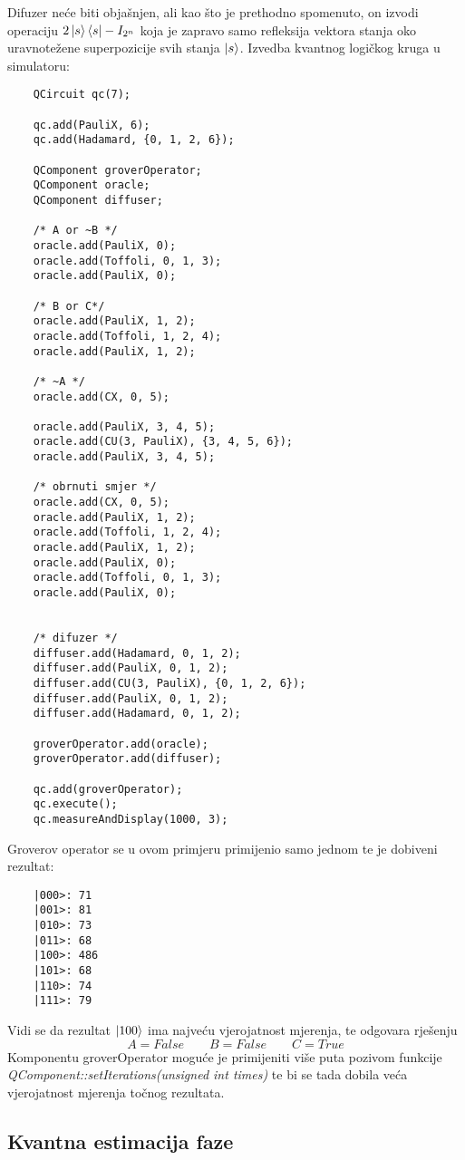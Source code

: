 Difuzer neće biti objašnjen, ali kao što je prethodno spomenuto, on izvodi operaciju $2\ket{s}\bra{s} - I_{2^n}$ koja je zapravo samo refleksija vektora stanja oko uravnotežene superpozicije svih stanja $\ket{s}$.
Izvedba kvantnog logičkog kruga u simulatoru:
\begin{lstlisting}
	QCircuit qc(7);

	qc.add(PauliX, 6);
	qc.add(Hadamard, {0, 1, 2, 6});

	QComponent groverOperator;
	QComponent oracle;
	QComponent diffuser;

	/* A or ~B */
	oracle.add(PauliX, 0);
	oracle.add(Toffoli, 0, 1, 3);
	oracle.add(PauliX, 0);
	
	/* B or C*/
	oracle.add(PauliX, 1, 2);
	oracle.add(Toffoli, 1, 2, 4);
	oracle.add(PauliX, 1, 2);

	/* ~A */
	oracle.add(CX, 0, 5);

	oracle.add(PauliX, 3, 4, 5);
	oracle.add(CU(3, PauliX), {3, 4, 5, 6});
	oracle.add(PauliX, 3, 4, 5);

	/* obrnuti smjer */
	oracle.add(CX, 0, 5);
	oracle.add(PauliX, 1, 2);
	oracle.add(Toffoli, 1, 2, 4);
	oracle.add(PauliX, 1, 2);
	oracle.add(PauliX, 0);
	oracle.add(Toffoli, 0, 1, 3);
	oracle.add(PauliX, 0);
	

	/* difuzer */
	diffuser.add(Hadamard, 0, 1, 2);
	diffuser.add(PauliX, 0, 1, 2);
	diffuser.add(CU(3, PauliX), {0, 1, 2, 6});
	diffuser.add(PauliX, 0, 1, 2);
	diffuser.add(Hadamard, 0, 1, 2);
	
	groverOperator.add(oracle);
	groverOperator.add(diffuser);

	qc.add(groverOperator);
	qc.execute();
	qc.measureAndDisplay(1000, 3);
\end{lstlisting}

Groverov operator se u ovom primjeru primijenio samo jednom te je dobiveni rezultat:
\begin{lstlisting}
	|000>: 71
	|001>: 81
	|010>: 73
	|011>: 68
	|100>: 486
	|101>: 68
	|110>: 74
	|111>: 79
\end{lstlisting}
Vidi se da rezultat $\ket{100}$ ima najveću vjerojatnost mjerenja, te odgovara rješenju
\begin{equation}
A = False \qquad B = False \qquad C = True
\end{equation}
Komponentu groverOperator moguće je primijeniti više puta pozivom funkcije \emph{QComponent::setIterations(unsigned int times)} te bi se tada dobila veća vjerojatnost mjerenja točnog rezultata.

\subsection{Kvantna estimacija faze}

